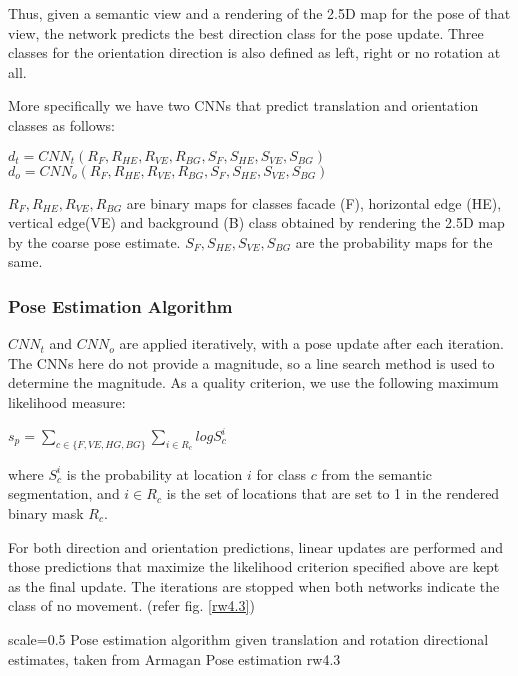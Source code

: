 Thus, given a semantic view and a rendering of the 2.5D map for the pose of that view, the network predicts the best direction class for the pose update. Three classes for the orientation direction is also defined as left, right or no rotation at all. 

More specifically we have two CNNs that predict translation and orientation classes as follows:

$d_t = CNN_t(R_F, R_{HE}, R_{VE}, R_{BG},S_F, S_{HE}, S_{VE}, S_{BG})$\\
$d_o = CNN_o(R_F, R_{HE}, R_{VE}, R_{BG},S_F, S_{HE}, S_{VE}, S_{BG})$

$R_F, R_{HE}, R_{VE}, R_{BG}$ are binary maps for classes facade (F), horizontal edge (HE), vertical edge(VE) and background (B) class obtained by rendering the 2.5D map by the coarse pose estimate. $S_F, S_{HE}, S_{VE}, S_{BG}$ are the probability maps for the same.

\subsubsection{Pose Estimation Algorithm}
$CNN_t$ and $CNN_o$ are applied iteratively, with a pose update after each iteration. The CNNs here do not provide a magnitude, so a line search method is used to determine the magnitude. As a quality criterion, we use the following maximum likelihood measure:

$s_p = \sum_{c \in \{F, VE, HG, BG\}}\sum_{i \in R_c} log S_c^i$

where $S^i_c$ is the probability at location $i$ for class $c$ from the semantic segmentation, and ${i\in R_c}$ is the set of locations that are set to 1 in the rendered binary mask $R_c$.

For both direction and orientation predictions, linear updates are performed and those predictions that maximize the likelihood criterion specified above are kept as the final update. The iterations are stopped when both networks indicate the class of no movement. (refer fig. \ref{rw4.3})

{scale=0.5}%
{Pose estimation algorithm given translation and rotation directional estimates, taken from \cite{Armagan2017}}%
{Armagan Pose estimation}%
{rw4.3} %



 




